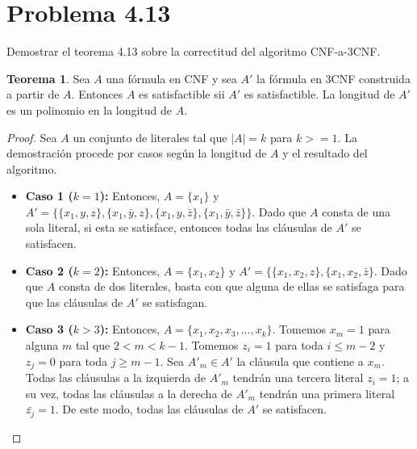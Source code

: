 \documentclass[letterpaper,12pt]{article}
\theoremstyle{definition}
\newtheorem*{thm}{Teorema}
\begin{document}
\section*{Problema 4.13}

Demostrar el teorema 4.13 sobre la correctitud del algoritmo CNF-a-3CNF.

\begin{thm}
  Sea \(A\) una fórmula en CNF y sea \(A'\) la fórmula en 3CNF construida a partir de \(A\). Entonces \(A\) es satisfactible sii \(A'\) es satisfactible. La longitud de \(A'\) es un polinomio en la longitud de \(A\).
\end{thm}


\begin{proof}
  Sea \(A\) un conjunto de literales tal que \(|A| = k\) para \(k >= 1\). La demostración procede por casos según la longitud de \(A\) y el resultado del algoritmo.

  \begin{itemize}
    \item \textbf{Caso 1 (\(k = 1\)): } Entonces, \(A = \{x_1\}\) y \(A' = \{ \{x_1, y, z\}, \{x_1, \bar{y}, z\}, \{x_1, y, \bar{z}\}, \{x_1, \bar{y}, \bar{z} \} \}\). Dado que \(A\) consta de una sola literal, si esta se satisface, entonces todas las cláusulas de \(A'\) se satisfacen.
    \item \textbf{Caso 2 (\(k = 2\)): } Entonces, \(A = \{x_1, x_2\}\) y \(A' = \{ \{x_1, x_2, z\}, \{x_1, x_2, \bar{z} \}\). Dado que \(A\) consta de dos literales, basta con que alguna de ellas se satisfaga para que las cláusulas de \(A'\) se satisfagan.
    \item \textbf{Caso 3 (\(k > 3\)): } Entonces, \(A = \{x_1, x_2, x_3, ..., x_k\}\). Tomemos \(x_m = 1\) para alguna \(m\) tal que \(2 < m < k - 1\). Tomemos \(z_i = 1\) para toda \(i \leq m - 2\) y \(z_j = 0\) para toda \(j \geq m - 1\). Sea \( A'_m \in A' \) la cláusula que contiene a \(x_m\). Todas las cláusulas a la izquierda de \( A'_m\) tendrán una tercera literal \(z_i = 1\); a su vez, todas las cláusulas a la derecha de \( A'_m\) tendrán una primera literal \(\bar{z_j} = 1\). De este modo, todas las cláusulas de \(A'\) se satisfacen.
  \end{itemize} 
\end{proof}
\end{document}
